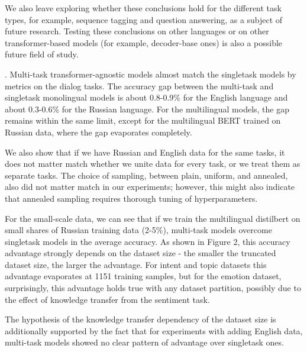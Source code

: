 \begin{itemize}
We also leave exploring whether these conclusions hold for the different task types, for example, sequence tagging and question answering, as a subject of future research. Testing these 
conclusions on other languages or on other transformer-based models (for example, decoder-base ones)  is also a possible future field of study.

.
Multi-task transformer-agnostic models almost match the singletask models by metrics on the dialog tasks. The accuracy gap between the multi-task and singletask monolingual models is about 0.8-0.9\% for the English language and about 0.3-0.6\% for the Russian language. For the multilingual models, the gap remains within the same limit, except for the multilingual BERT trained on Russian data, where the gap evaporates completely.


We also show that if we have Russian and English data for the same tasks, it does not matter match whether we unite data for every task, or we treat them as separate tasks. The choice of sampling, between plain, uniform, and annealed, also did not matter match in our experiments; however, this might also indicate that annealed sampling requires thorough tuning of hyperparameters.

For the small-scale data, we can see that if we train the multilingual distilbert on small shares of Russian training data (2-5\%), multi-task models overcome singletask models in the average accuracy. As shown in Figure 2, this accuracy advantage strongly depends on the dataset size - the smaller the truncated dataset size, the larger the advantage. For intent and topic datasets this advantage evaporates at 1151 training samples, but for the emotion dataset, surprisingly, this advantage holds true with any dataset partition, possibly due to the effect of knowledge transfer from the sentiment task.

The hypothesis of the knowledge transfer dependency of the dataset size is additionally supported by the fact that for experiments with adding English data, multi-task models showed no clear pattern of advantage over singletask ones.


\end{itemize}
